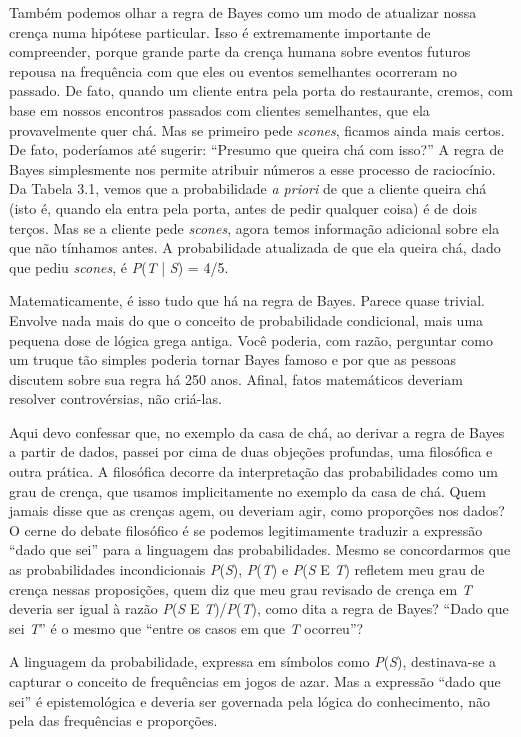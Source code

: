 \documentclass[11pt,a5paper,twoside]{book}
\begin{document}
Também podemos olhar a regra de Bayes como um modo de atualizar nossa crença numa hipótese particular. Isso é extremamente importante de compreender, porque grande parte da crença humana sobre eventos futuros repousa na frequência com que eles ou eventos semelhantes ocorreram no passado. De fato, quando um cliente entra pela porta do restaurante, cremos, com base em nossos encontros passados com clientes semelhantes, que ela provavelmente quer chá. Mas se primeiro pede \textit{scones}, ficamos ainda mais certos. De fato, poderíamos até sugerir: “Presumo que queira chá com isso?” A regra de Bayes simplesmente nos permite atribuir números a esse processo de raciocínio. Da Tabela 3.1, vemos que a probabilidade \textit{a priori} de que a cliente queira chá (isto é, quando ela entra pela porta, antes de pedir qualquer coisa) é de dois terços. Mas se a cliente pede \textit{scones}, agora temos informação adicional sobre ela que não tínhamos antes. A probabilidade atualizada de que ela queira chá, dado que pediu \textit{scones}, é \textit{P}(\textit{T} | \textit{S}) = 4/5.

Matematicamente, é isso tudo que há na regra de Bayes. Parece quase trivial. Envolve nada mais do que o conceito de probabilidade condicional, mais uma pequena dose de lógica grega antiga. Você poderia, com razão, perguntar como um truque tão simples poderia tornar Bayes famoso e por que as pessoas discutem sobre sua regra há 250 anos. Afinal, fatos matemáticos deveriam resolver controvérsias, não criá-las.

Aqui devo confessar que, no exemplo da casa de chá, ao derivar a regra de Bayes a partir de dados, passei por cima de duas objeções profundas, uma filosófica e outra prática. A filosófica decorre da interpretação das probabilidades como um grau de crença, que usamos implicitamente no exemplo da casa de chá. Quem jamais disse que as crenças agem, ou deveriam agir, como proporções nos dados? O cerne do debate filosófico é se podemos legitimamente traduzir a expressão “dado que sei” para a linguagem das probabilidades. Mesmo se concordarmos que as probabilidades incondicionais \textit{P}(\textit{S}), \textit{P}(\textit{T}) e \textit{P}(\textit{S} E \textit{T}) refletem meu grau de crença nessas proposições, quem diz que meu grau revisado de crença em \textit{T} deveria ser igual à razão \textit{P}(\textit{S} E \textit{T})/\textit{P}(\textit{T}), como dita a regra de Bayes? “Dado que sei \textit{T}” é o mesmo que “entre os casos em que \textit{T} ocorreu”?

A linguagem da probabilidade, expressa em símbolos como \textit{P}(\textit{S}), destinava-se a capturar o conceito de frequências em jogos de azar. Mas a expressão “dado que sei” é epistemológica e deveria ser governada pela lógica do conhecimento, não pela das frequências e proporções.
\end{document}
